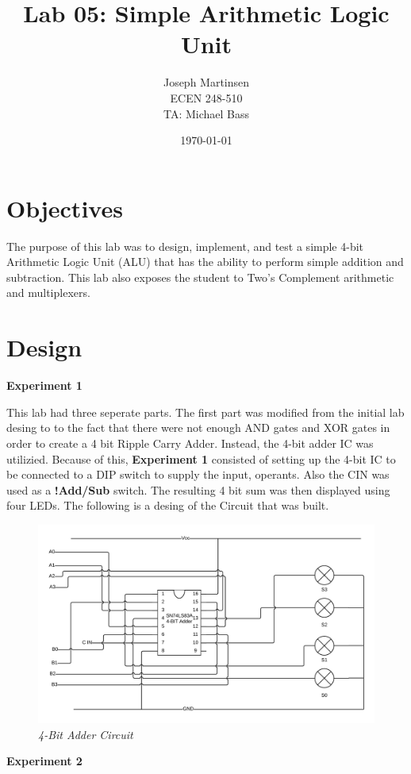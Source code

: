 \documentclass[titlepage]{article}
\title{\textbf{Lab 05: Simple Arithmetic Logic Unit}}
\author{Joseph Martinsen \\ ECEN 248-510 \\ TA: Michael Bass}
\date{\today}
\begin{document}
\maketitle



\section*{Objectives}
\hspace{15pt} The purpose of this lab was to design, implement, and test a simple
 4-bit Arithmetic Logic Unit (ALU) that has the ability to perform simple
 addition and subtraction. This lab also exposes the student to Two's Complement
 arithmetic and multiplexers.

\section*{Design}
\textbf{Experiment 1}

 This lab had three seperate parts. The first part was modified
 from the initial lab desing to to the fact that there were not enough AND gates
 and XOR gates in order to create a 4 bit Ripple Carry Adder. Instead, the 4-bit
 adder IC was utilizied. Because of this, \textbf{Experiment 1} consisted of
 setting up the 4-bit IC to be connected to a DIP switch to supply the input,
 operants. Also the CIN was used as a \textbf{!Add/Sub} switch. The resulting
 4 bit sum was then displayed using four LEDs. The following is a desing of the
 Circuit that was built. \\
 \vspace{-30pt}
\begin{center}
  \begin{figure}[h]
    \includegraphics[scale=0.2]{4-BitAdder.png}
    \caption{\textit{4-Bit Adder Circuit}}
  \end{figure}
\end{center}
\vspace{-40pt}\textbf{Experiment 2}
\end{document}
